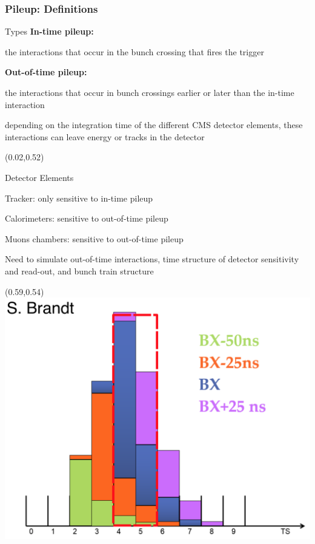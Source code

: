 \begin{frame}[t]\frametitle{Pileup: Definitions}
	\vspace*{-0.45cm}
    \begin{block}{Types}
	    \textbf{In-time pileup:}
    	\begin{customlist}{2.5em}{0em}
    		\small
    	    \item the interactions that occur in the bunch crossing that fires the trigger
    	\end{customlist}
    	\textbf{Out-of-time pileup:}
    	\begin{customlist}{2.5em}{0em}
    		\small
    	    \item the interactions that occur in bunch crossings earlier or later than the in-time interaction
    	    \item depending on the integration time of the different CMS detector elements, these interactions can leave energy or tracks in the detector
    	\end{customlist}
    \end{block}
    \begin{textblock}{0.5}(0.02,0.52)
    	\begin{exampleblock}{Detector Elements}
    		\begin{customlist}{2.5em}{0em}
    			\scriptsize
    		    \item Tracker: only sensitive to in-time pileup
    		    \item Calorimeters: sensitive to out-of-time pileup
    		    \item Muons chambers: sensitive to out-of-time pileup
    		\end{customlist}
    	\end{exampleblock}
    	{\color{ForestGreen}Need to simulate out-of-time interactions, time structure of detector sensitivity and read-out, and bunch train structure}
    \end{textblock}
    \begin{textblock}{0.37}(0.59,0.54)
    	\includegraphics[width=\textwidth]{images/pileup/HCALPulse.png}
    \end{textblock}
\end{frame}